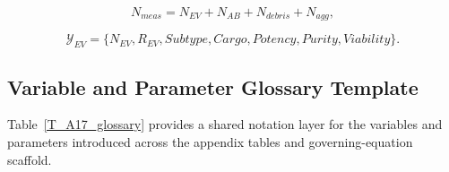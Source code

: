 \begin{equation}
N_{meas}=N_{EV}+N_{AB}+N_{debris}+N_{agg},
\end{equation}

\begin{equation}
\mathcal{Y}_{EV}=\{N_{EV},R_{EV},Subtype,Cargo,Potency,Purity,Viability\}.
\end{equation}

\subsection*{Variable and Parameter Glossary Template}

Table~\ref{T_A17_glossary} provides a shared notation layer for the variables and parameters introduced across the appendix tables and governing-equation scaffold.

